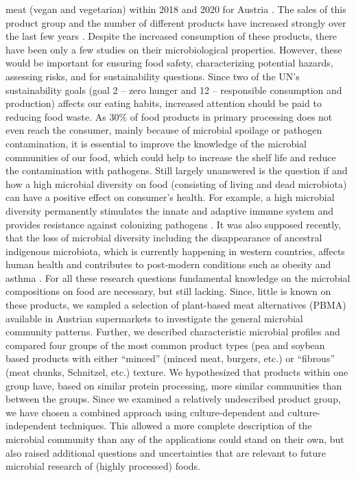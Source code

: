 \documentclass[preprint, 3p,
authoryear]{elsarticle} %
\begin{document}
meat (vegan and vegetarian) within 2018 and 2020 for Austria
\citep{EuropeanUnionsHorizon2020reasearchandinnovationprogramme.2021}.
The sales of this product group and the number of different products
have increased strongly over the last few years
\citep{Curtain.2019, EuropeanUnionsHorizon2020reasearchandinnovationprogramme.2021}.
Despite the increased consumption of these products, there have been
only a few studies on their microbiological properties. However, these
would be important for ensuring food safety, characterizing potential
hazards, assessing risks, and for sustainability questions. Since two of
the UN's sustainability goals (goal 2 -- zero hunger and 12 --
responsible consumption and production) affects our eating habits,
increased attention should be paid to reducing food waste. As 30\% of
food products in primary processing does not even reach the consumer,
mainly because of microbial spoilage or pathogen contamination, it is
essential to improve the knowledge of the microbial communities of our
food, which could help to increase the shelf life and reduce the
contamination with pathogens. Still largely unanswered is the question
if and how a high microbial diversity on food (consisting of living and
dead microbiota) can have a positive effect on consumer's health. For
example, a high microbial diversity permanently stimulates the innate
and adaptive immune system and provides resistance against colonizing
pathogens \citep{Crowe.1973, Mackowiak.1982, Smith.2007}. It was also
supposed recently, that the loss of microbial diversity including the
disappearance of ancestral indigenous microbiota, which is currently
happening in western countries, affects human health and contributes to
post-modern conditions such as obesity and asthma
\citep{Blaser.2009, Vangay.2018}. For all these research questions
fundamental knowledge on the microbial compositions on food are
necessary, but still lacking. Since, little is known on these products,
we sampled a selection of plant-based meat alternatives (PBMA) available
in Austrian supermarkets to investigate the general microbial community
patterns. Further, we described characteristic microbial profiles and
compared four groups of the most common product types (pea and soybean
based products with either ``minced'' (minced meat, burgers, etc.) or
``fibrous'' (meat chunks, Schnitzel, etc.) texture. We hypothesized that
products within one group have, based on similar protein processing,
more similar communities than between the groups. Since we examined a
relatively undescribed product group, we have chosen a combined approach
using culture-dependent and culture-independent techniques. This allowed
a more complete description of the microbial community than any of the
applications could stand on their own, but also raised additional
questions and uncertainties that are relevant to future microbial
research of (highly processed) foods.
\end{document}
